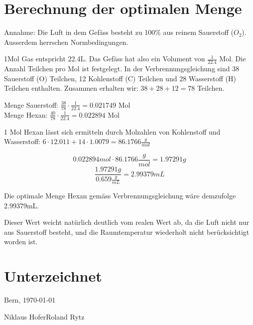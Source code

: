 \documentclass[11pt,paper=a4,final]{scrartcl}
\begin{document}
\section{Berechnung der optimalen Menge}
Annahme: Die Luft in dem Gef\"ass besteht zu 100\% aus reinem Sauerstoff
(\(O_2\)). Ausserdem herrschen Normbedingungen.

1Mol Gas entspricht 22.4L. Das Gef\"ass hat also ein Volument von
\(\frac{1}{22.4}\) Mol. Die Anzahl Teilchen pro Mol ist festgelegt. In der
Verbrennungsgleichung sind 38 Sauerstoff (O) Teilchen, 12 Kohlenstoff (C)
Teilchen und 28 Wasserstoff (H) Teilchen enthalten.
Zusammen erhalten wir: \( 38 + 28 + 12 = 78 \) Teilchen.

Menge Sauerstoff: \( \frac{38}{78} \cdot \frac{1}{22.4} = 0.021749\) Mol \\
Menge Hexan:	  \( \frac{40}{78} \cdot \frac{1}{22.4} = 0.022894\) Mol

1 Mol Hexan l\"asst sich ermitteln durch Molzahlen von Kohlenstoff und
Wasserstoff: \(6 \cdot 12.011 + 14 \cdot 1.0079 = 86.1766 \frac{g}{mol} \)

\[ 0.022894 mol \cdot 86.1766\frac{g}{mol} = 1.97291g \]
\[ \frac{1.97291g}{0.659\frac{g}{mL}} = 2.99379mL \]

Die optimale Menge Hexan gem\"ass Verbrennungsgleichung w\"are demzufolge
2.99379mL.

Dieser Wert weicht nat\"urlich deutlich vom realen Wert ab, da die Luft nicht
nur aus Sauerstoff besteht, und die Raumtemperatur wiederholt nicht
ber\"ucksichtigt worden ist.
\section{Unterzeichnet}
Bern, \today

\vspace{0.5cm}
\noindent
Niklaus Hofer\hfill Roland Rytz

\vspace{2cm}
\noindent
\hrulefill \hfill \hrulefill

\newpage
\listoftables
\listoffigures
{}

\end{document}
